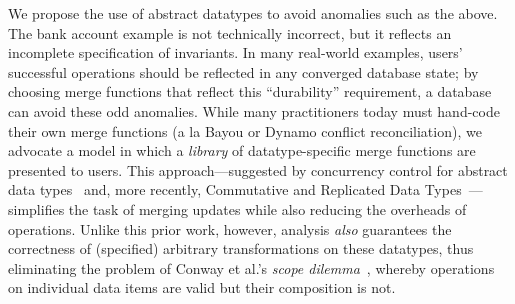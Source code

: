 We propose the use of abstract datatypes to avoid anomalies such as
the above. The bank account example is not technically incorrect, but
it reflects an incomplete specification of invariants. In many
real-world examples, users' successful operations should be reflected
in any converged database state; by choosing merge functions that
reflect this ``durability'' requirement, a database can avoid these
odd anomalies. While many practitioners today must hand-code their own
merge functions (a la Bayou or Dynamo conflict reconciliation), we
advocate a model in which a \textit{library} of datatype-specific
merge functions are presented to users. This approach---suggested by
concurrency control for abstract data types~\cite{weihl-thesis} and,
more recently, Commutative and Replicated Data
Types~\cite{crdt}---simplifies the task of merging updates while also
reducing the overheads of operations. Unlike this prior work, however,
\iconfluence analysis \textit{also} guarantees the correctness of
(specified) arbitrary transformations on these datatypes, thus
eliminating the problem of Conway et al.'s \textit{scope
  dilemma}~\cite{blooml}, whereby operations on individual data items
are valid but their composition is not.




